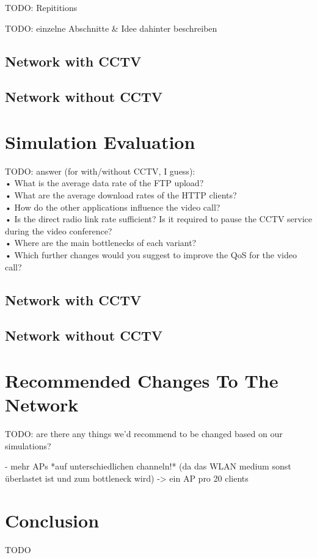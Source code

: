 \documentclass[
10pt, %
a4paper, %
oneside, %
headinclude,footinclude, %
BCOR5mm, %
]{scrartcl}
\begin{document}
TODO: Repititions


TODO: einzelne Abschnitte \& Idee dahinter beschreiben

\subsection{Network with CCTV}
\subsection{Network without CCTV}

\section{Simulation Evaluation}
TODO: answer (for with/without CCTV, I guess):\\
• What is the average data rate of the FTP upload?\\
• What are the average download rates of the HTTP clients?\\
• How do the other applications influence the video call?\\
• Is the direct radio link rate sufficient? Is it required to pause the CCTV service during the video conference?\\
• Where are the main bottlenecks of each variant?\\
• Which further changes would you suggest to improve the QoS for the video call?\\

\subsection{Network with CCTV}


\subsection{Network without CCTV}

\section{Recommended Changes To The Network}
TODO: are there any things we'd recommend to be changed based on our simulations?

- mehr APs *auf unterschiedlichen channeln!* (da das WLAN medium sonst überlastet ist und zum bottleneck wird) -> ein AP pro 20 clients

\section{Conclusion}
TODO
\end{document}
